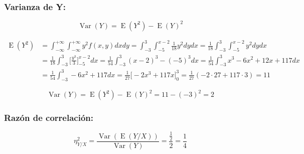 \documentclass[tikz]{article}
\DeclareMathOperator{\Var}{Var}
\DeclareMathOperator{\E}{E}
\begin{document}
\newpage

\subsubsection*{Varianza de Y:}

\[\Var(Y)=\E(Y^2)-\E(Y)^2\]

\begin{align*}
  \E(Y^2)&=\int_{-\infty}^{+\infty}\int_{-\infty}^{+\infty}y^2f(x,y)dxdy=\int_{-3}^3\int_{-5}^{x-2}\frac{1}{18}y^2dydx=\frac{1}{18}\int_{-3}^3\int_{-5}^{x-2}y^2dydx \\
         &=\frac{1}{18}\int_{-3}^3\bigg[\frac{y^3}{3}\bigg]_{-5}^{x-2}dx=\frac{1}{54}\int_{-3}^{3}(x-2)^3-(-5)^3dx=\frac{1}{54}\int_{-3}^3x^3-6x^2+12x+117dx \\
         &=\frac{1}{54}\int_{-3}^3-6x^2+117dx=\frac{1}{27}\bigg[-2x^3+117x\bigg]_0^3=\frac{1}{27}(-2\cdot 27+117\cdot 3)=11
\end{align*}

\[\Var(Y)=\E(Y^2)-\E(Y)^2=11-(-3)^2=2\]

\subsubsection*{Razón de correlación:}

\[\eta_{Y/X}^2=\frac{\Var(\E(Y/X))}{\Var(Y)}=\frac{\frac{1}{2}}{2}=\frac{1}{4}\]
\end{document}

